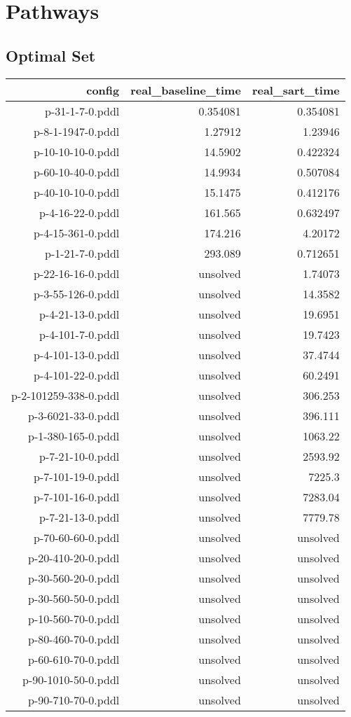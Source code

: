 \documentclass{article}
\begin{document}
                \newpage \section{Pathways}
                    \subsection*{Optimal Set}
                    
                            \begin{center}
                            \scriptsize
                            \begin{tabular}{r|r|r}
                            config & real\_baseline\_time & real\_sart\_time\\\midrule
                             p-31-1-7-0.pddl&0.354081&0.354081\\
 p-8-1-1947-0.pddl&1.27912&1.23946\\
 p-10-10-10-0.pddl&14.5902&0.422324\\
 p-60-10-40-0.pddl&14.9934&0.507084\\
 p-40-10-10-0.pddl&15.1475&0.412176\\
 p-4-16-22-0.pddl&161.565&0.632497\\
 p-4-15-361-0.pddl&174.216&4.20172\\
 p-1-21-7-0.pddl&293.089&0.712651\\
 p-22-16-16-0.pddl&unsolved&1.74073\\
 p-3-55-126-0.pddl&unsolved&14.3582\\
 p-4-21-13-0.pddl&unsolved&19.6951\\
 p-4-101-7-0.pddl&unsolved&19.7423\\
 p-4-101-13-0.pddl&unsolved&37.4744\\
 p-4-101-22-0.pddl&unsolved&60.2491\\
 p-2-101259-338-0.pddl&unsolved&306.253\\
 p-3-6021-33-0.pddl&unsolved&396.111\\
 p-1-380-165-0.pddl&unsolved&1063.22\\
 p-7-21-10-0.pddl&unsolved&2593.92\\
 p-7-101-19-0.pddl&unsolved&7225.3\\
 p-7-101-16-0.pddl&unsolved&7283.04\\
 p-7-21-13-0.pddl&unsolved&7779.78\\
 p-70-60-60-0.pddl&unsolved&unsolved\\
 p-20-410-20-0.pddl&unsolved&unsolved\\
 p-30-560-20-0.pddl&unsolved&unsolved\\
 p-30-560-50-0.pddl&unsolved&unsolved\\
 p-10-560-70-0.pddl&unsolved&unsolved\\
 p-80-460-70-0.pddl&unsolved&unsolved\\
 p-60-610-70-0.pddl&unsolved&unsolved\\
 p-90-1010-50-0.pddl&unsolved&unsolved\\
 p-90-710-70-0.pddl&unsolved&unsolved
                            \end{tabular}
                            \end{center}
                    
\end{document}
